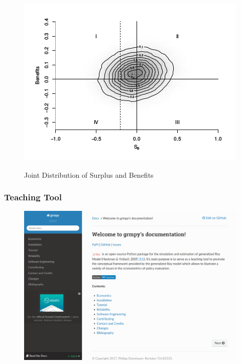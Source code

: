\begin{frame}

\begin{figure}[htp]\centering
	\caption{Joint Distribution of Surplus and Benefits}\label{Treatment Effects Benefits}\scalebox{0.80}
	{\includegraphics{./material/fig-distribution-surplus_wolabel.png}}
\end{figure}

\end{frame}


\begin{frame}
\frametitle{Teaching Tool}

\begin{figure}[htp]\centering
	\includegraphics[width=\textwidth]{./material/fig-online-documentation.png}
\end{figure}

\end{frame}



